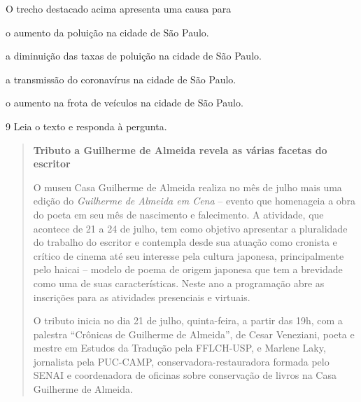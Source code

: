 
O trecho destacado acima apresenta uma causa para

\begin{escolha}
  \item o aumento da poluição na cidade de São Paulo.

  \item a diminuição das taxas de poluição na cidade de São Paulo.

  \item a transmissão do coronavírus na cidade de São Paulo.

  \item o aumento na frota de veículos na cidade de São Paulo.
\end{escolha}

\num{9} Leia o texto e responda à pergunta.

\begin{quote}
\textbf{Tributo a Guilherme de Almeida revela as várias facetas do 
escritor}

O museu Casa Guilherme de Almeida realiza no mês de julho mais uma
edição do \textit{Guilherme de Almeida em Cena} -- evento que homenageia a obra
do poeta em seu mês de nascimento e falecimento. A atividade, que
acontece de 21 a 24 de julho, tem como objetivo apresentar a pluralidade
do trabalho do escritor e contempla desde sua atuação como cronista e
crítico de cinema até seu interesse pela cultura japonesa,
principalmente pelo haicai -- modelo de poema de origem japonesa que tem
a brevidade como uma de suas características. Neste ano a programação
abre as inscrições para as atividades presenciais e virtuais.

O tributo inicia no dia 21 de julho, quinta-feira, a partir das 19h, com
a palestra ``Crônicas de Guilherme de Almeida'', de Cesar Veneziani,
poeta e mestre em Estudos da Tradução pela FFLCH-USP, e Marlene Laky,
jornalista pela PUC-CAMP, conservadora-restauradora formada pelo SENAI e
coordenadora de oficinas sobre conservação de livros na Casa Guilherme
de Almeida.
\end{quote}


